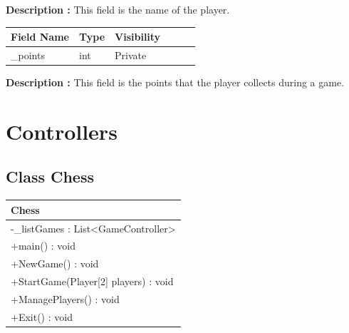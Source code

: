 \documentclass[12pt]{article}
\begin{document}
\textbf{Description :} This field is the name of the player.

\begin{table}[H]
    \begin{tabular}{llllll}
    \hline
    \multicolumn{1}{|l|}{\cellcolor[HTML]{EFEFEF}\textbf{Field Name}} & \multicolumn{1}{l|}{\cellcolor[HTML]{EFEFEF}\textbf{Type}} & \multicolumn{1}{l|}{\cellcolor[HTML]{EFEFEF}\textbf{Visibility}} \\ \hline
    \multicolumn{1}{|l|}{\_points}                                      & \multicolumn{1}{l|}{int}                                 & \multicolumn{1}{l|}{Private}                                   \\ \hline
    \end{tabular}
\end{table}

\textbf{Description :} This field is the points that the player collects during a game.

\newpage


\section{Controllers}


\subsection{Class Chess}

\begin{table}[H]
    \begin{tabular}{|l|}
    \hline
    \rowcolor[HTML]{C0C0C0} 
    \textbf{Chess}                                             \\ \hline
    \rowcolor[HTML]{EFEFEF} 
    -\_listGames : List\textless{}GameController\textgreater{} \\ \hline
    +main() : void                                             \\ \hline
    +NewGame() : void                                          \\ \hline
    +StartGame(Player{[}2{]} players) : void                   \\ \hline
    +ManagePlayers() : void                                    \\ \hline
    +Exit() : void                                             \\ \hline
    \end{tabular}
\end{table}
\end{document}
